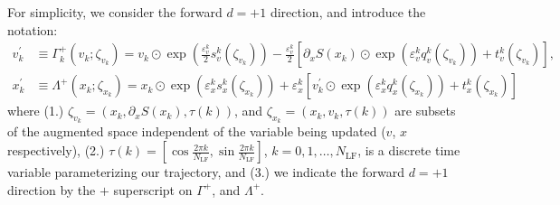 \documentclass{article} %
\begin{document}
For simplicity, we consider the forward \(d=+1\) direction, and introduce the notation:
%
\begin{align}
   v^{\prime}_{k} &\equiv \Gamma^{+}_{k}(v_{k};\zeta_{v_{k}})
   = v_{k}\odot \exp{\left(\tfrac{\varepsilon^{k}_{v}}{2}s_{v}^{k}(\zeta_{v_{k}})\right)} -
   \tfrac{\varepsilon^{k}_{v}}{2}{\left[\partial_{x}S(x_{k})\odot\exp{\left(\varepsilon^{k}_{v} q_{v}^{k}(\zeta_{v_{k}})\right)}
      +t_{v}^{k}(\zeta_{v_{k}})\right]},\label{eq:new_momentum_update}\\
   x^{\prime}_{k} &\equiv \Lambda^{+}(x_{k};\zeta_{x_{k}})
   = x_{k}\odot\exp(\varepsilon^{k}_{x} s^{k}_{x}(\zeta_{x_{k}}))
   + \varepsilon^{k}_{x}\left[v^{\prime}_{k}\odot\exp(\varepsilon^{k}_{x} q^{k}_{x}(\zeta_{x_{k}}))
         + t^{k}_{x}(\zeta_{x_{k}})\right]\label{eq:new_position_update}
\end{align}
%
where (1.) \(\zeta_{v_{k}} = (x_{k}, \partial_{x}S(x_{k}), \tau(k))\), and \(\zeta_{x_{k}} = (x_{k}, v_{k}, \tau(k))\)
are subsets of the augmented space independent of the variable being updated (\(v\), \(x\) respectively), (2.) \(\tau(k)
= {\left[\cos\tfrac{2\pi k}{N_{\mathrm{LF}}}, \sin\tfrac{2\pi k}{N_{\mathrm{LF}}}\right]}\), \(k = 0, 1, \ldots,
N_{\mathrm{LF}}\), is a discrete time variable parameterizing our trajectory, and (3.) we indicate the forward \(d=+1\)
direction by the \(+\) superscript on \(\Gamma^{+}\), and \(\Lambda^{+}\).
%
\end{document}
